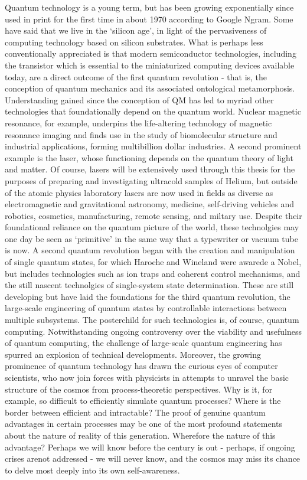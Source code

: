 Quantum technology is a young term, but has been growing exponentially
since used in print for the first time in about 1970 according to Google
Ngram. Some have said that we live in the `silicon age', in light of the
pervasiveness of computing technology based on silicon substrates. What
is perhaps less conventionally appreciated is that modern semiconductor
technologies, including the transistor which is essential to the
miniaturized computing devices available today, are a direct outcome of
the first quantum revolution - that is, the conception of quantum
mechanics and its associated ontological metamorphosis. Understanding
gained since the conception of QM has led to myriad other technologies
that foundationally depend on the quantum world. Nuclear magnetic
resonance, for example, underpins the life-altering technology of
magnetic resonance imaging and finds use in the study of biomolecular
structure and industrial applications, forming multibillion dollar
industries. A second prominent example is the laser, whose functioning
depends on the quantum theory of light and matter. Of course, lasers
will be extensively used through this thesis for the purposes of
preparing and investigating ultracold samples of Helium, but outside of
the atomic physics laboratory lasers are now used in fields as diverse
as electromagnetic and gravitational astronomy, medicine, self-driving
vehicles and robotics, cosmetics, manufacturing, remote sensing, and
miltary use. Despite their foundational reliance on the quantum picture
of the world, these technolgies may one day be seen as `primitive' in
the same way that a typewriter or vacuum tube is now. A second quantum
revolution began with the creation and manipulation of single quantum
states, for which Haroche and Wineland were awarede a Nobel, but
includes technologies such as ion traps and coherent control mechanisms,
and the still nascent technolgies of single-system state determination.
These are still developing but have laid the foundations for the third
quantum revolution, the large-scale engineering of quantum states by
controllable interactions between multiple subsystems. The posterchild
for such technologies is, of course, quantum computing. Notwithstanding
ongoing controversy over the viability and usefulness of quantum
computing, the challenge of large-scale quantum engineering has spurred
an explosion of technical developments. Moreover, the growing prominence
of quantum technology has drawn the curious eyes of computer scientists,
who now join forces with physicists in attempts to unravel the basic
structure of the cosmos from process-theoretic perspectives. Why is it,
for example, so difficult to efficiently simulate quantum processes?
Where is the border between efficient and intractable? The proof of
genuine quantum advantages in certain processes may be one of the most
profound statements about the nature of reality of this generation.
Wherefore the nature of this advantage? Perhaps we will know before the
century is out - perhaps, if ongoing crises arenot addressed - we will
never know, and the cosmos may miss its chance to delve most deeply into
its own self-awareness.

